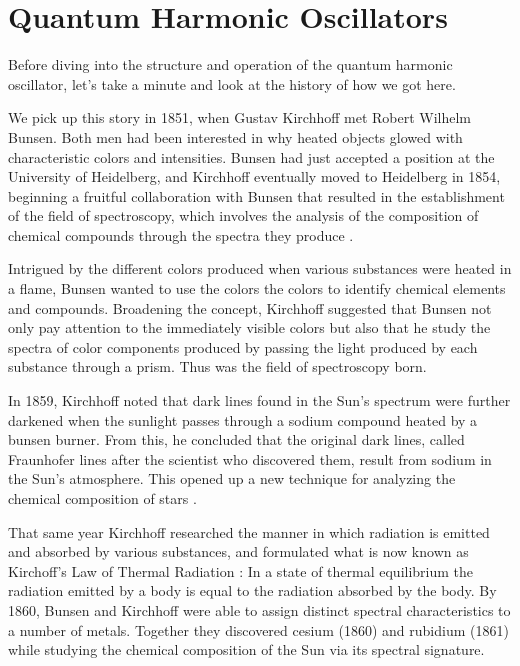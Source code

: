 \documentclass{article}
\theoremstyle{definition}
\begin{document}
\section{Quantum Harmonic Oscillators}
\label{sec:quantum_harmonic_oscillators}
Before diving into the structure and operation
of the quantum harmonic oscillator, let's take
a minute and look at the history of how we 
got here. 


\bigskip
\noindent
We pick up this story in 1851, when Gustav Kirchhoff met Robert
Wilhelm Bunsen.  Both men had been interested in why heated
objects glowed with characteristic colors and intensities. Bunsen
had just accepted a position at the University of Heidelberg, and
Kirchhoff eventually moved to Heidelberg in 1854, beginning a
fruitful collaboration with Bunsen that resulted in the
establishment of the field of spectroscopy, which involves the
analysis of the composition of chemical compounds through the
spectra they produce \cite{wiki:kirchoff, wiki:bunsen}.

\bigskip
\noindent
Intrigued by the different colors produced when various
substances were heated in a flame, Bunsen wanted to use the
colors the colors to identify chemical elements and
compounds. Broadening the concept, Kirchhoff suggested that
Bunsen not only pay attention to the immediately visible colors
but also that he study the spectra of color components produced
by passing the light produced by each substance through a
prism. Thus was the field of spectroscopy born.

\bigskip
\noindent
In 1859, Kirchhoff noted that dark lines found in the Sun's
spectrum were further darkened when the sunlight passes through a
sodium compound heated by a bunsen burner. From this, he
concluded that the original dark lines, called Fraunhofer lines
after the scientist who discovered them, result from sodium in
the Sun's atmosphere. This opened up a new technique for
analyzing the chemical composition of stars
\cite{bunsen_and_kirchoff}.

\bigskip
\noindent
That same year Kirchhoff researched the manner in which radiation
is emitted and absorbed by various substances, and formulated
what is now known as Kirchoff's Law of Thermal Radiation
\cite{kirchoffs_law_of_thermal_radiation}: In a state of thermal
equilibrium the radiation emitted by a body is equal to the
radiation absorbed by the body. By 1860, Bunsen and Kirchhoff
were able to assign distinct spectral characteristics to a number
of metals. Together they discovered cesium (1860) and rubidium
(1861) while studying the chemical composition of the Sun via its
spectral signature.
\end{document}
